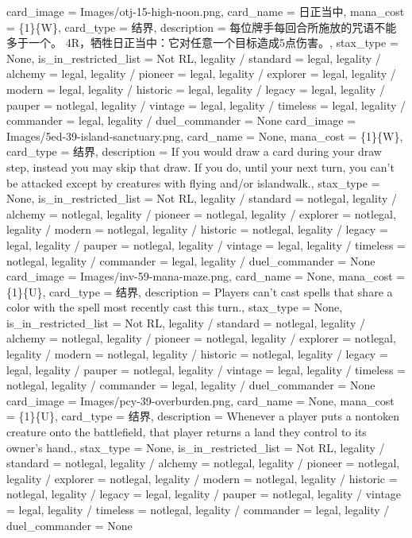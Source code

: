 \documentclass[lang = cn, color = black, 10pt]{AllThatStax}
\begin{document}
\card
{
	card_image = Images/otj-15-high-noon.png,
	card_name = 日正当中,
	mana_cost = \{1\}\{W\},
	card_type = 结界,
	description = 每位牌手每回合所施放的咒语不能多于一个。
	{4}{R}，牺牲日正当中：它对任意一个目标造成5点伤害。,
	stax_type = None,
	is_in_restricted_list = Not RL,
	legality / standard = legal,
	legality / alchemy = legal,
	legality / pioneer = legal,
	legality / explorer = legal,
	legality / modern = legal,
	legality / historic = legal,
	legality / legacy = legal,
	legality / pauper = notlegal,
	legality / vintage = legal,
	legality / timeless = legal,
	legality / commander = legal,
	legality / duel_commander = None
}
\card
{
	card_image = Images/5ed-39-island-sanctuary.png,
	card_name = None,
	mana_cost = \{1\}\{W\},
	card_type = 结界,
	description = If you would draw a card during your draw step, instead you may skip that draw. If you do, until your next turn, you can't be attacked except by creatures with flying and/or islandwalk.,
	stax_type = None,
	is_in_restricted_list = Not RL,
	legality / standard = notlegal,
	legality / alchemy = notlegal,
	legality / pioneer = notlegal,
	legality / explorer = notlegal,
	legality / modern = notlegal,
	legality / historic = notlegal,
	legality / legacy = legal,
	legality / pauper = notlegal,
	legality / vintage = legal,
	legality / timeless = notlegal,
	legality / commander = legal,
	legality / duel_commander = None
}
\card
{
	card_image = Images/inv-59-mana-maze.png,
	card_name = None,
	mana_cost = \{1\}\{U\},
	card_type = 结界,
	description = Players can't cast spells that share a color with the spell most recently cast this turn.,
	stax_type = None,
	is_in_restricted_list = Not RL,
	legality / standard = notlegal,
	legality / alchemy = notlegal,
	legality / pioneer = notlegal,
	legality / explorer = notlegal,
	legality / modern = notlegal,
	legality / historic = notlegal,
	legality / legacy = legal,
	legality / pauper = notlegal,
	legality / vintage = legal,
	legality / timeless = notlegal,
	legality / commander = legal,
	legality / duel_commander = None
}
\card
{
	card_image = Images/pcy-39-overburden.png,
	card_name = None,
	mana_cost = \{1\}\{U\},
	card_type = 结界,
	description = Whenever a player puts a nontoken creature onto the battlefield, that player returns a land they control to its owner's hand.,
	stax_type = None,
	is_in_restricted_list = Not RL,
	legality / standard = notlegal,
	legality / alchemy = notlegal,
	legality / pioneer = notlegal,
	legality / explorer = notlegal,
	legality / modern = notlegal,
	legality / historic = notlegal,
	legality / legacy = legal,
	legality / pauper = notlegal,
	legality / vintage = legal,
	legality / timeless = notlegal,
	legality / commander = legal,
	legality / duel_commander = None
}
\end{document}
